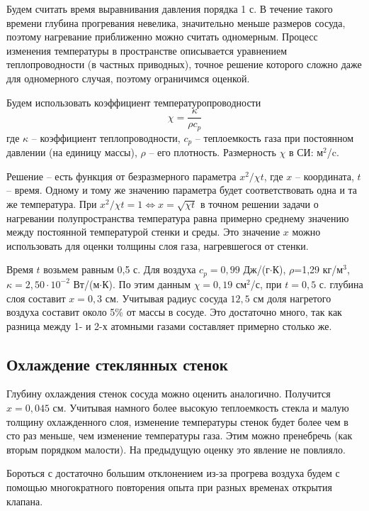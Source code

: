 \documentclass[a4paper,12pt]{article}
\begin{document}
    Будем считать время выравнивания давления порядка 1 с. В течение такого времени глубина прогревания невелика, значительно меньше размеров сосуда, поэтому нагревание приближенно можно считать одномерным. Процесс изменения температуры в пространстве описывается уравнением теплопроводности (в частных приводных), точное решение которого сложно даже для одномерного случая, поэтому ограничимся оценкой.

    Будем использовать коэффициент температуропроводности
    \begin{equation*}
        \chi=\frac{\kappa}{\rho c_p}
    \end{equation*}
    где $\kappa$ -- коэффициент теплопроводности, $c_p$ -- теплоемкость газа при постоянном давлении (на единицу массы), $\rho$ -- его плотность. Размерность $\chi$ в СИ: м$^2$/c.

    Решение -- есть функция от безразмерного параметра $x^2/\chi t$, где $x$ -- координата, $t$ -- время. Одному и тому же значению параметра будет соответствовать одна и та же температура. При $x^2/\chi t=1 \Leftrightarrow x=\sqrt{\chi t}$ в точном решении задачи о нагревании полупространства температура равна примерно среднему значению между постоянной температурой стенки и среды. Это значение $x$ можно использовать для оценки толщины слоя газа, нагревшегося от стенки.
    
    Время $t$ возьмем равным 0,5 с. Для воздуха $c_p=0,99$ Дж/(г$\cdot$К), $\rho$=1,29 кг/м$^3$, $\kappa=2,50\cdot10^{-2}$ Вт/(м$\cdot$К). По этим данным $\chi=0,19$ см$^2$/с, при $t=0,5$ с. глубина слоя составит $x=0,3$ см. Учитывая радиус сосуда $12,5$ см доля нагретого воздуха составит около 5\% от массы в сосуде. Это достаточно много, так как разница между 1- и 2-х атомными газами составляет примерно столько же.

    \subsection*{Охлаждение стеклянных стенок}
    Глубину охлаждения стенок сосуда можно оценить аналогично. Получится $x=0,045$ см. Учитывая намного более высокую теплоемкость стекла и малую толщину охлажденного слоя, изменение температуры стенок будет более чем в сто раз меньше, чем изменение температуры газа. Этим можно пренебречь (как вторым порядком малости). На предыдущую оценку это явление не повлияло.

    Бороться с достаточно большим отклонением из-за прогрева воздуха будем с помощью многократного повторения опыта при разных временах открытия клапана.
\end{document}
